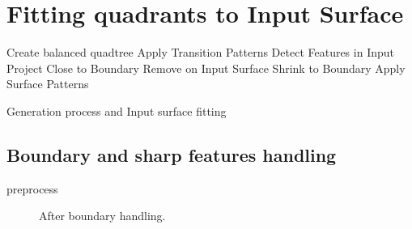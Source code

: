 \documentclass[10pt]{article}
\begin{document}
\section{Fitting quadrants to Input Surface}
\label{sec:method}



\begin{algorithm}[H]

\SetAlgoLined
{}
\nl {}
 \nl Create balanced quadtree\; \label{alg:goto}
 \nl Apply Transition Patterns\;
 \nl Detect Features in Input\;
 Project Close to Boundary\;
 Remove on Input Surface\;
 Shrink to Boundary\;
 \nl Apply Surface Patterns\;
 \caption{Generation process and Input surface fitting}
 \label{alg:surfacefitting}
\end{algorithm}

\subsection{Boundary and sharp features handling}

preprocess

 \begin{figure}[htb]
\centering
\caption{After boundary handling.}
\label{fig:boundary}
\end{figure}
\end{document}
